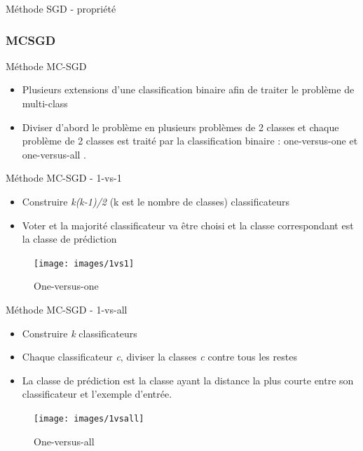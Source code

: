 \documentclass[11pt]{beamer}
\begin{document}
\begin{otherlanguage}{french}
\begin{frame}{Méthode SGD - propriété}
\end{frame}

\subsubsection*{MCSGD}
\begin{frame}{Méthode MC-SGD}
\begin{itemize}
\item Plusieurs extensions d'une classification binaire afin de traiter le problème de multi-class
\item Diviser d'abord le problème en plusieurs problèmes de 2 classes et chaque problème de 2 classes est traité par la classification binaire : one-versus-one \cite{vv95} et one-versus-all \cite{uk99}.
\end{itemize}
\end{frame}

\begin{frame}{Méthode MC-SGD - 1-vs-1}
\begin{itemize}
\item Construire \textit{k(k-1)/2} (k est le nombre de classes) classificateurs
\item Voter et la majorité classificateur va être choisi et la classe correspondant est la classe de prédiction
\end{itemize}

\begin{figure}[ht!]
\centering
\texttt{[image: images/1vs1]}
\caption{One-versus-one}
\label{fig:1vs1}
\end{figure}

\end{frame}

\begin{frame}{Méthode MC-SGD - 1-vs-all}
\begin{itemize}
\item Construire \textit{k} classificateurs
\item Chaque classificateur \textit{c}, diviser la classes \textit{c} contre tous les restes
\item La classe de prédiction est la classe ayant la distance la plus courte entre son classificateur et l'exemple d'entrée.
\end{itemize}

\begin{figure}[ht!]
\centering
\texttt{[image: images/1vsall]}
\caption{One-versus-all}
\label{fig:1vs1}
\end{figure}


\end{frame}
\end{otherlanguage}
\end{document}
